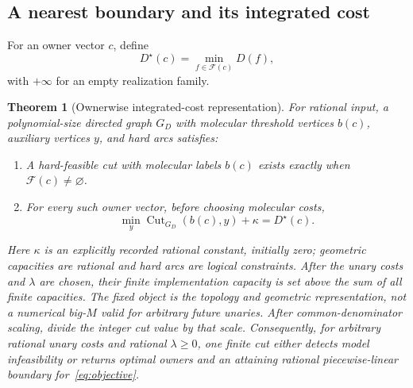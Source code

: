 \documentclass[10pt,letterpaper]{article}
\newtheorem{theorem}{Theorem}
\begin{document}
\subsection{A nearest boundary and its integrated cost}
For an owner vector $c$, define
\[
 D^\star(c)=\min_{f\in\mathcal F(c)}D(f),
\]
with $+\infty$ for an empty realization family.
\begin{theorem}[Ownerwise integrated-cost representation]\label{thm:cut}
For rational input, a polynomial-size directed graph $G_D$ with molecular threshold vertices $b(c)$, auxiliary vertices $y$, and hard arcs satisfies:
\begin{enumerate}
\item A hard-feasible cut with molecular labels $b(c)$ exists exactly when $\mathcal F(c)\ne\varnothing$.
\item For \emph{every} such owner vector, before choosing molecular costs,
\begin{equation}
 \min_y\operatorname{Cut}_{G_D}(b(c),y)+\kappa=D^\star(c).\label{eq:ownerwise}
\end{equation}
\end{enumerate}
Here $\kappa$ is an explicitly recorded rational constant, initially zero; geometric capacities are rational and hard arcs are logical constraints. After the unary costs and $\lambda$ are chosen, their finite implementation capacity is set above the sum of all finite capacities. The fixed object is the topology and geometric representation, not a numerical big-$M$ valid for arbitrary future unaries. After common-denominator scaling, divide the integer cut value by that scale. Consequently, for arbitrary rational unary costs and rational $\lambda\ge0$, one finite cut either detects model infeasibility or returns optimal owners and an attaining rational piecewise-linear boundary for~\eqref{eq:objective}.
\end{theorem}
\end{document}
